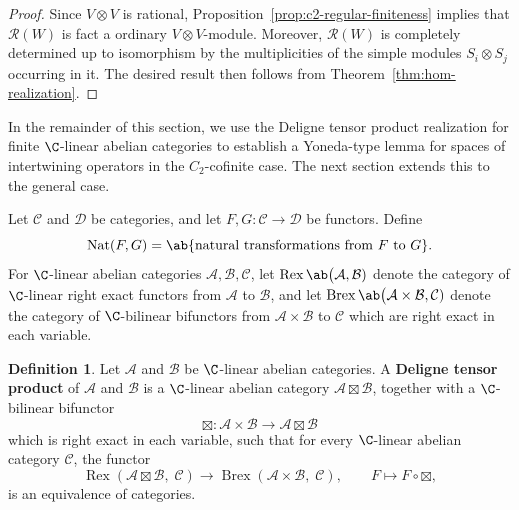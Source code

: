 \documentclass[12pt, english]{article}
\numberwithin{equation}{section}
\DeclareMathOperator{\Nat}{Nat}
\DeclareMathOperator{\Rex}{Rex}
\DeclareMathOperator{\Brex}{Brex}
\theoremstyle{plain}
\theoremstyle{definition}
\newtheorem{definition}[lemma]{Definition}
\theoremstyle{remark}
\begin{document}
	\begin{proof}
		Since $V \otimes V$ is rational, Proposition~\ref{prop:c2-regular-finiteness} implies that $\mathcal{R}(W)$ is fact a ordinary $V\otimes V$-module.
		Moreover, $\mathcal{R}(W)$ is completely determined up to isomorphism by the multiplicities of the simple modules $S_i \otimes S_j$ occurring in it.
		The desired result then follows from Theorem~\ref{thm:hom-realization}.
	\end{proof}
	
	In the remainder of this section, we use the Deligne tensor product realization for finite $\C$-linear abelian categories to establish a Yoneda-type lemma for spaces of intertwining operators in the $C_2$-cofinite case. The next section extends this to the general case.
	
	Let $\mathcal{C}$ and $\mathcal{D}$ be categories, and let $F, G \colon \mathcal{C} \to \mathcal{D} $ be functors.
	Define
	\[
	\Nat(F, G) = \ab\{\text{natural transformations from $F$ to $G$}\}.
	\]
	For $\C$-linear abelian categories $\mathcal{A}, \mathcal{B}, \mathcal{C}$, let $\Rex \ab\big(\mathcal{A}, \mathcal{B})$ denote the category of $\C$-linear right exact functors from
	$\mathcal{A}$ to $\mathcal{B}$, and let $\Brex \ab\big(\mathcal{A}\times\mathcal{B}, \mathcal{C})$
	denote the category of $\C$-bilinear bifunctors from $\mathcal{A}\times\mathcal{B}$ to $\mathcal{C}$ which are right exact in each variable.
	
	
	
	\begin{definition} \cite{Del90}
		Let $\mathcal{A}$ and $\mathcal{B}$ be $\C$-linear abelian categories.
		A \textbf{Deligne tensor product} of $\mathcal{A}$ and $\mathcal{B}$ is a $\C$-linear abelian category $\mathcal{A}\boxtimes\mathcal{B}$, together with a $\C$-bilinear bifunctor
		\[
		\boxtimes \colon \mathcal{A}\times\mathcal{B} \longrightarrow \mathcal{A}\boxtimes\mathcal{B}
		\]
		which is right exact in each variable, such that for every $\C$-linear abelian category $\mathcal{C}$, the functor
		\[
		\Rex(\mathcal{A}\boxtimes\mathcal{B}, \; \mathcal{C})
		\longrightarrow
		\Brex(\mathcal{A}\times\mathcal{B}, \; \mathcal{C}),
		\qquad
		F \longmapsto F\circ \boxtimes,
		\]
		is an equivalence of categories.
		
	\end{definition}
	
\end{document}
